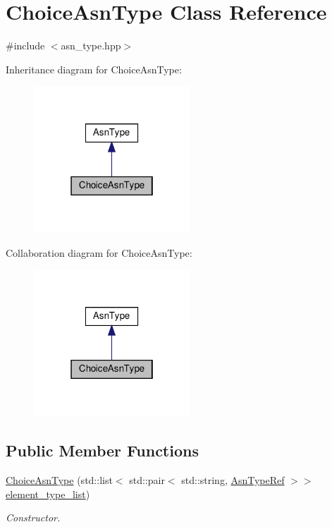 \hypertarget{classChoiceAsnType}{}\section{Choice\+Asn\+Type Class Reference}
\label{classChoiceAsnType}


{\ttfamily \#include $<$asn\+\_\+type.\+hpp$>$}



Inheritance diagram for Choice\+Asn\+Type\+:
\nopagebreak
\begin{figure}[H]
\begin{center}
\leavevmode
\includegraphics[width=166pt]{d8/d0d/classChoiceAsnType__inherit__graph}
\end{center}
\end{figure}


Collaboration diagram for Choice\+Asn\+Type\+:
\nopagebreak
\begin{figure}[H]
\begin{center}
\leavevmode
\includegraphics[width=166pt]{d5/dad/classChoiceAsnType__coll__graph}
\end{center}
\end{figure}
\subsection*{Public Member Functions}
\begin{DoxyCompactItemize}
\item 
\hyperlink{classChoiceAsnType_a15e9e237156a15a4feac6a9003fe298a}{Choice\+Asn\+Type} (std\+::list$<$ std\+::pair$<$ std\+::string, \hyperlink{asn__type_8hpp_a456d7cf50c15d087cc0428ae80834b35}{Asn\+Type\+Ref} $>$$>$ \hyperlink{classChoiceAsnType_aa7f41981d0f8263299a5c829e0737981}{element\+\_\+type\+\_\+list})
\begin{DoxyCompactList}\small\item\em Constructor. \end{DoxyCompactList}\end{DoxyCompactItemize}
